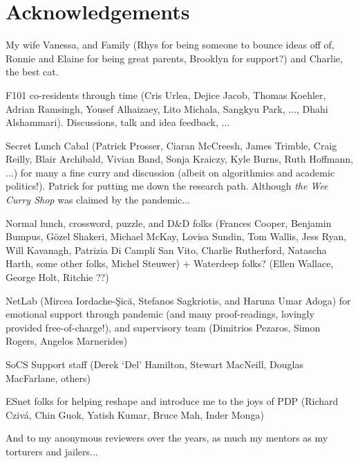 \chapter*{Acknowledgements}

My wife Vanessa, and Family (Rhys for being someone to bounce ideas off of, Ronnie and Elaine for being great parents, Brooklyn for support?) and Charlie, the best cat.

F101 co-residents through time (Cris Urlea, Dejice Jacob, Thomas Koehler, Adrian Ramsingh, Yousef Alhaizaey, Lito Michala, Sangkyu Park, ..., Dhahi Alshammari). Discussions, talk and idea feedback, ...

Secret Lunch Cabal (Patrick Prosser, Ciaran McCreesh, James Trimble, Craig Reilly, Blair Archibald, Vivian Band, Sonja Kraiczy, Kyle Burns, Ruth Hoffmann, ...) for many a fine curry and discussion (albeit on algorithmics and academic politics!). Patrick for putting me down the research path. Although \emph{the Wee Curry Shop} was claimed by the pandemic...

Normal lunch, crossword, puzzle, and D\&D folks (Frances Cooper, Benjamin Bumpus, G\"{o}zel Shakeri, Michael McKay, Lovisa Sundin, Tom Wallis, Jess Ryan, Will Kavanagh, Patrizia Di Campli San Vito, Charlie Rutherford, Natascha Harth, some other folks, Michel Steuwer) + Waterdeep folks? (Ellen Wallace, George Holt, Ritchie ??)

NetLab (Mircea Iordache-\c{S}ic\u{a}, Stefanos Sagkriotis, and Haruna Umar Adoga) for emotional support through pandemic (and many proof-readings, lovingly provided free-of-charge!), and supervisory team (Dimitrios Pezaros, Simon Rogers, Angelos Marnerides)

SoCS Support staff (Derek `Del' Hamilton, Stewart MacNeill, Douglas MacFarlane, others)

ESnet folks for helping reshape and introduce me to the joys of PDP (Richard Cziv\'{a}, Chin Guok, Yatish Kumar, Bruce Mah, Inder Monga)

And to my anonymous reviewers over the years, as much my mentors as my torturers and jailers...